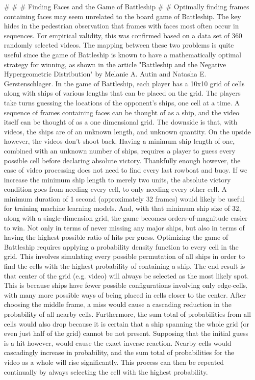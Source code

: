 \documentclass{article}
\newcommand{\br}{ \hfill \break}
\begin{document}
%
\date{June 21 2020} \br \begin{adjustwidth}{2.5em}{0pt}
\#\br
\#\br
\# Finding Faces and the Game of Battleship \br
\#\br
\#\br
\br
Optimally finding frames containing faces may seem unrelated to the board game of Battleship. The key hides in the pedestrian observation that frames with faces most often occur in sequences. For empirical validity, this was confirmed based on a data set of 360 randomly selected videos. The mapping between these two problems is quite useful since the game of Battleship is known to have a mathematically optimal strategy for winning, as shown in the article "Battleship and the Negative Hypergeometric Distribution" by Melanie A. Autin and Natasha E. Gerstenschlager. In the game of Battleship, each player has a 10x10 grid of cells along with ships of various lengths that can be placed on the grid. The players take turns guessing the locations of the opponent's ships, one cell at a time. A sequence of frames containing faces can be thought of as a ship, and the video itself can be thought of as a one dimensional grid. The downside is that, with videos, the ships are of an unknown length, and unknown quantity. On the upside however, the videos don't shoot back. Having a minimum ship length of one, combined with an unknown number of ships, requires a player to guess every possible cell before declaring absolute victory. Thankfully enough however, the case of video processing does not need to find every last rowboat and buoy. If we increase the minimum ship length to merely two units, the absolute victory condition goes from needing every cell, to only needing every-other cell. A minimum duration of 1 second (approximately 32 frames) would likely be useful for training machine learning models. And, with that minimum ship size of 32, along with a single-dimension grid, the game becomes orders-of-magnitude easier to win. Not only in terms of never missing any major ships, but also in terms of having the highest possible ratio of hits per guess.\br
\br
Optimizing the game of Battleship requires applying a probability density function to every cell in the grid. This involves simulating every possible permutation of all ships in order to find the cells with the highest probability of containing a ship. The end result is that center of the grid (e.g. video) will always be selected as the most likely spot. This is because ships have fewer possible configurations involving only edge-cells, with many more possible ways of being placed in cells closer to the center. After choosing the middle frame, a miss would cause a cascading reduction in the probability of all nearby cells. Furthermore, the sum total of probabilities from all cells would also drop because it is certain that a ship spanning the whole grid (or even just half of the grid) cannot be not present. Supposing that the initial guess is a hit however, would cause the exact inverse reaction. Nearby cells would cascadingly increase in probability, and the sum total of probabilities for the video as a whole will rise significantly. This process can then be repeated continually by always selecting the cell with the highest probability.\br

\end{adjustwidth}
\end{document}
